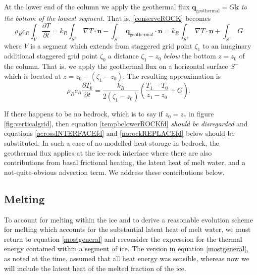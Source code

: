 \documentclass[12pt,final]{amsart}%
\theoremstyle{plain}
\theoremstyle{definition}
\theoremstyle{remark}
\newcommand{\ddt}[1]{\ensuremath{\frac{\partial #1}{\partial t}}}
\newcommand{\grad}{\nabla}
\newcommand{\khat}{\mathbf{k}}
\newcommand{\nhat}{\mathbf{n}}
\newcommand{\bq}{{\mathbf{q}}}
\begin{document}
At the lower end of the column we apply the geothermal flux $\bq_{\text{geothermal}} = G \khat$ \emph{to the bottom of the lowest segment}.  That is, \eqref{conserveROCK} becomes
\begin{equation*}
\rho_R c_R \int_V \ddt{T} = k_R \int_{S^+} \grad T \cdot \nhat - \int_{S^-} \bq_{\text{geothermal}} \cdot \nhat = k_R \int_{S^+} \grad T \cdot \nhat + \int_{S^-} G
\end{equation*}
where $V$ is a segment which extends from staggered grid point $\zeta_1$ to an imaginary additional staggered grid point $\zeta_{0}$ a distance $\zeta_1 - z_0$ \emph{below} the bottom $z=z_0$ of the column.  That is, we apply the geothermal flux on a horizontal surface $S^-$ which is located at $z=z_0 - (\zeta_1-z_0)$.  The resulting approximation is
\begin{equation}
\rho_R c_R \ddt{T_0} = \frac{k_R}{2(\zeta_1-z_0)} \left(\frac{T_{1}-T_0}{z_{1}-z_0} +G\right). \label{tempbclowerROCKfd}
\end{equation}

If there happens to be no bedrock, which is to say if $z_0=z_\ast$ in figure \ref{fig:verticalgrid}, then equation \eqref{tempbclowerROCKfd} \emph{should be disregarded} and equations \eqref{acrossINTERFACEfd} and \eqref{norockREPLACEfd} below should be substituted.  In such a case of no modelled heat storage in bedrock, the geothermal flux applies at the ice-rock interface where there are also contributions from basal frictional heating, the latent heat of melt water, and a not-quite-obvious advection term.  We address these contributions below.

\subsection*{Melting}  To account for melting within the ice and to derive a reasonable evolution scheme for melting which accounts for the substantial latent heat of melt water, we must return to equation \eqref{mostgeneral} and reconsider the expression for the thermal energy contained within a segment of ice.  The version in equation \eqref{mostgeneral}, as noted at the time, assumed that all heat energy was sensible, whereas now we will include the latent heat of the melted fraction of the ice.
\end{document}
